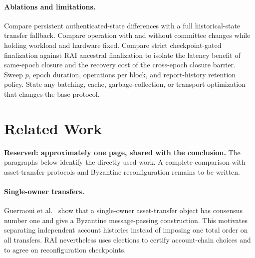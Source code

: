 \documentclass[10pt,twocolumn]{article}
\begin{document}
\begin{center}
\end{center}

\paragraph{Ablations and limitations.} Compare persistent authenticated-state differences with a full historical-state transfer fallback. Compare operation with and without committee changes while holding workload and hardware fixed. Compare strict checkpoint-gated finalization against RAI ancestral finalization to isolate the latency benefit of same-epoch closure and the recovery cost of the cross-epoch closure barrier. Sweep $p$, epoch duration, operations per block, and report-history retention policy. State any batching, cache, garbage-collection, or transport optimization that changes the base protocol.

\begin{center}
\end{center}

\section{Related Work}
\noindent\textbf{Reserved: approximately one page, shared with the conclusion.} The paragraphs below identify the directly used work. A complete comparison with asset-transfer protocols and Byzantine reconfiguration remains to be written.

\paragraph{Single-owner transfers.} Guerraoui et al.~\cite{ConsensusNumber} show that a single-owner asset-transfer object has consensus number one and give a Byzantine message-passing construction. This motivates separating independent account histories instead of imposing one total order on all transfers. RAI nevertheless uses elections to certify account-chain choices and to agree on reconfiguration checkpoints.
\end{document}
